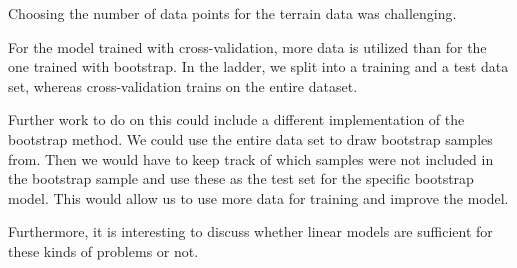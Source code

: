 Choosing the number of data points for the terrain data was challenging. 

For the model trained with cross-validation, more data is utilized than for the one trained with bootstrap. In the ladder, we split into a training and a test data set, whereas cross-validation trains on the entire dataset. 

Further work to do on this could include a different implementation of the bootstrap method. We could use the entire data set to draw bootstrap samples from. Then we would have to keep track of which samples were not included in the bootstrap sample and use these as the test set for the specific bootstrap model. This would allow us to use more data for training and improve the model. 

Furthermore, it is interesting to discuss whether linear models are sufficient for these kinds of problems or not. 

